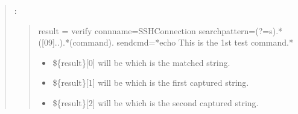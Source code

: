 \documentclass[letterpaper,10pt,english]{sphinxmanual}
\begin{document}
\begin{quote}
\sphinxAtStartPar
{}:
\begin{quote}

\sphinxAtStartPar
{}

\sphinxAtStartPar
{}

\begin{sphinxVerbatim}[commandchars=\\\{\}]
\PYGZdl{}\PYGZob{}result\PYGZcb{} = verify  conn\PYGZus{}name=SSH\PYGZus{}Connection
                     search\PYGZus{}pattern=(?\PYGZlt{}=\PYGZbs{}s).*([0\PYGZhy{}9]..).*(command).\PYGZdl{}
                     send\PYGZus{}cmd=*echo This is the 1st test command.*
\end{sphinxVerbatim}
\begin{itemize}
\item {} 
\sphinxAtStartPar
\$\{result\}{[}0{]} will be  which is the matched string.

\item {} 
\sphinxAtStartPar
\$\{result\}{[}1{]} will be  which is the first captured string.

\item {} 
\sphinxAtStartPar
\$\{result\}{[}2{]} will be  which is the second captured string.

\end{itemize}
\end{quote}
\end{quote}
\end{document}
